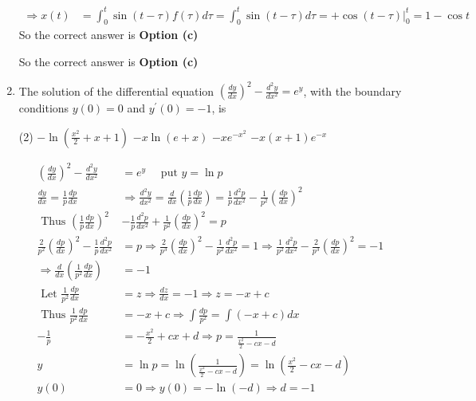 \begin{enumerate}
\begin{answer}
\begin{align*}
	\Rightarrow x(t)&=\int_{0}^{t} \sin (t-\tau) f(\tau) d \tau=\int_{0}^{t} \sin (t-\tau) d \tau=+\left.\cos (t-\tau)\right|_{0} ^{t}=1-\cos t
	\end{align*}
	So the correct answer is \textbf{Option (c)}
\end{answer}
		So the correct answer is \textbf{Option (c)}
\item The solution of the differential equation $\left(\frac{d y}{d x}\right)^{2}-\frac{d^{2} y}{d x^{2}}=e^{y}$, with the boundary conditions $y(0)=0$ and $y^{\prime}(0)=-1$, is
 \begin{tasks}(2)
	\task[\textbf{a.}]$-\ln \left(\frac{x^{2}}{2}+x+1\right)$
	\task[\textbf{b.}]$-x \ln (e+x)$
	\task[\textbf{c.}]$-x e^{-x^{2}}$
	\task[\textbf{d.}] $-x(x+1) e^{-x}$
\end{tasks}
\begin{answer}
	\begin{align*}
	\left(\frac{d y}{d x}\right)^{2}-\frac{d^{2} y}{d x^{2}}&=e^{y} \quad \text { put } y=\ln p\\
	\frac{d y}{d x}=\frac{1}{p} \frac{d p}{d x} &\Rightarrow \frac{d^{2} y}{d x^{2}}=\frac{d}{d x}\left(\frac{1}{p} \frac{d p}{d x}\right)=\frac{1}{p} \frac{d^{2} p}{d x^{2}}-\frac{1}{p^{2}}\left(\frac{d p}{d x}\right)^{2}\\
	\text { Thus }\left(\frac{1}{p} \frac{d p}{d x}\right)^{2}&-\frac{1}{p} \frac{d^{2} p}{d x^{2}}+\frac{1}{p^{2}}\left(\frac{d p}{d x}\right)^{2}=p \\
	\frac{2}{p^{2}}\left(\frac{d p}{d x}\right)^{2}-\frac{1}{p} \frac{d^{2} p}{d x^{2}}&=p \Rightarrow \frac{2}{p^{3}}\left(\frac{d p}{d x}\right)^{2}-\frac{1}{p^{2}} \frac{d^{2} p}{d x^{2}}=1 \Rightarrow \frac{1}{p^{2}} \frac{d^{2} p}{d x^{2}}-\frac{2}{p^{3}}\left(\frac{d p}{d x}\right)^{2}=-1 \\
	\Rightarrow \frac{d}{d x}\left(\frac{1}{p^{2}} \frac{d p}{d x}\right)&=-1\\
	\text { Let } \frac{1}{p^{2}} \frac{d p}{d x}&=z \Rightarrow \frac{d z}{d x}=-1 \Rightarrow z=-x+c\\
	\text { Thus } \frac{1}{p^{2}} \frac{d p}{d x}&=-x+c \Rightarrow \int \frac{d p}{p^{2}}=\int(-x+c) d x\\
	-\frac{1}{p}&=-\frac{x^{2}}{2}+c x+d \Rightarrow p=\frac{1}{\frac{x^{2}}{2}-c x-d} \\
	y&=\ln p=\ln \left(\frac{1}{\frac{x^{2}}{2}-c x-d}\right)=\ln \left(\frac{x^{2}}{2}-c x-d\right) \\
	y(0)&=0 \Rightarrow y(0)=-\ln (-d) \Rightarrow d=-1\\

\end{align*}
\end{answer}
\end{enumerate}
